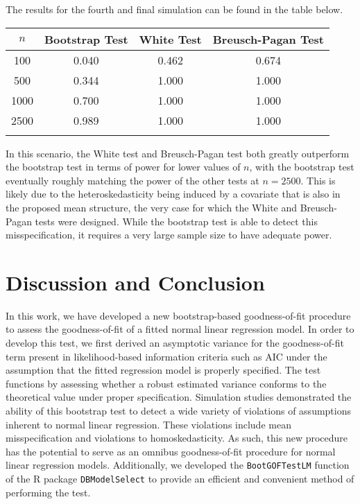 \documentclass[12pt]{article} %
\theoremstyle{definition}
\begin{document}
The results for the fourth and final simulation can be found in the table below.

\begin{table}[H]
	\centering
	\small\addtolength{\tabcolsep}{-3pt}
	\setlength\extrarowheight{-3pt}
	{
	\begin{tabular}{ c|c|c|c}
	$n$ & Bootstrap Test & White Test & Breusch-Pagan Test \\
	 \hline
	 100 & 0.040 & 0.462 & 0.674 \\
	 500 & 0.344 & 1.000 & 1.000 \\
	 1000 & 0.700 & 1.000 & 1.000 \\
	 2500 & 0.989 & 1.000 & 1.000 \\
	 \Xhline{3\arrayrulewidth}
	\end{tabular}
	}
\end{table}

In this scenario, the White test and Breusch-Pagan test both greatly outperform the bootstrap test in terms of power for lower values of $n$, with the bootstrap test
eventually roughly matching the power of the other tests at $n = 2500$. This is likely due to the heteroskedasticity being induced by a covariate that is also in the 
proposed mean structure, the very case for which the White and Breusch-Pagan tests were designed. While the bootstrap test is able to detect this misspecification,
it requires a very large sample size to have adequate power.


\section{Discussion and Conclusion}

In this work, we have developed a new bootstrap-based goodness-of-fit procedure to assess the goodness-of-fit of a fitted normal linear regression model. In order
to develop this test, we first derived an asymptotic variance for the goodness-of-fit term present in likelihood-based information criteria such as AIC under the assumption
that the fitted regression model is properly specified. The test functions by assessing whether a robust estimated variance conforms to the
theoretical value under proper specification. Simulation studies demonstrated the ability of this bootstrap test to detect a wide variety of violations of assumptions inherent to
normal linear regression. These violations include mean misspecification and violations to homoskedasticity. As such, this new procedure has the potential to serve as an omnibus
goodness-of-fit procedure for normal linear regression models. Additionally, we developed the \verb|BootGOFTestLM| function of the R package \verb|DBModelSelect| to provide
an efficient and convenient method of performing the test.
\end{document}
